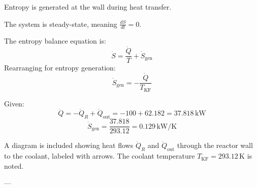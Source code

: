 Entropy is generated at the wall during heat transfer.  

The system is steady-state, meaning \( \frac{dS}{dt} = 0 \).  

The entropy balance equation is:  
\[
\dot{S} = \frac{\dot{Q}}{T} + \dot{S}_{\text{gen}}
\]  
Rearranging for entropy generation:  
\[
\dot{S}_{\text{gen}} = -\frac{\dot{Q}}{T_{\text{KF}}}
\]  

Given:  
\[
\dot{Q} = -\dot{Q}_R + \dot{Q}_{\text{out}} = -100 + 62.182 = 37.818 \, \text{kW}
\]  
\[
\dot{S}_{\text{gen}} = \frac{37.818}{293.12} = 0.129 \, \text{kW/K}
\]  

A diagram is included showing heat flows \( \dot{Q}_R \) and \( \dot{Q}_{\text{out}} \) through the reactor wall to the coolant, labeled with arrows. The coolant temperature \( T_{\text{KF}} = 293.12 \, \text{K} \) is noted.  

---